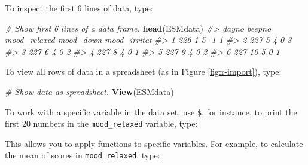 \documentclass[]{book}
\newenvironment{Shaded}{\begin{snugshade}}{\end{snugshade}}
\newcommand{\KeywordTok}[1]{\textcolor[rgb]{0.13,0.29,0.53}{\textbf{#1}}}
\newcommand{\DataTypeTok}[1]{\textcolor[rgb]{0.13,0.29,0.53}{#1}}
\newcommand{\DecValTok}[1]{\textcolor[rgb]{0.00,0.00,0.81}{#1}}
\newcommand{\CommentTok}[1]{\textcolor[rgb]{0.56,0.35,0.01}{\textit{#1}}}
\newcommand{\OperatorTok}[1]{\textcolor[rgb]{0.81,0.36,0.00}{\textbf{#1}}}
\newcommand{\NormalTok}[1]{#1}
\begin{document}
To inspect the first 6 lines of data, type:

\begin{Shaded}
\begin{Highlighting}[]
\CommentTok{# Show first 6 lines of a data frame.}
\KeywordTok{head}\NormalTok{(ESMdata)}
\CommentTok{#>   dayno beepno mood_relaxed mood_down mood_irritat}
\CommentTok{#> 1   226      1            5        -1            1}
\CommentTok{#> 2   227      5            4         0            3}
\CommentTok{#> 3   227      6            4         0            2}
\CommentTok{#> 4   227      8            4         0            1}
\CommentTok{#> 5   227      9            4         0            2}
\CommentTok{#> 6   227     10            5         0            1}
\end{Highlighting}
\end{Shaded}

To view all rows of data in a spreadsheet (as in Figure
\ref{fig:r-import}), type:

\begin{Shaded}
\begin{Highlighting}[]
\CommentTok{# Show data as spreadsheet.}
\KeywordTok{View}\NormalTok{(ESMdata)}
\end{Highlighting}
\end{Shaded}

To work with a specific variable in the data set, use \texttt{\$}, for
instance, to print the first 20 numbers in the \texttt{mood\_relaxed}
variable, type:

\begin{Shaded}
\end{Shaded}

This allows you to apply functions to specific variables. For example,
to calculate the mean of scores in \texttt{mood\_relaxed}, type:

\begin{Shaded}
\end{Shaded}
\end{document}
